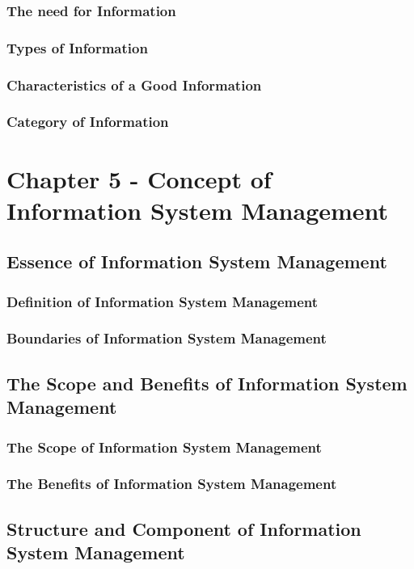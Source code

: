 \documentclass[12pt,titlepage]{article}
\begin{document}
\subsubsection{The need for Information}
\subsubsection{Types of Information}
\subsubsection{Characteristics of a Good Information}
\subsubsection{Category of Information}

\newpage

\section{Chapter 5 - Concept of Information System Management}

\subsection{Essence of Information System Management}
\subsubsection{Definition of Information System Management}
\subsubsection{Boundaries of Information System Management}

\subsection{The Scope and Benefits of Information System Management}
\subsubsection{The Scope of Information System Management}
\subsubsection{The Benefits of Information System Management}

\subsection{Structure and Component of Information System Management}
\end{document}
